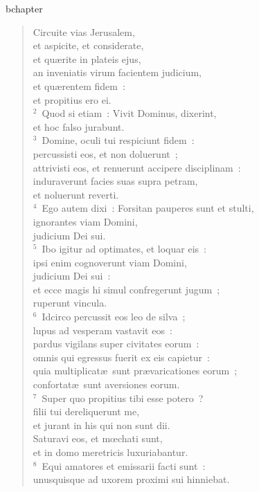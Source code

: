 bchapter\begin{verse}\vspace{-19pt}Circuite vias Jerusalem,\\ et aspicite, et considerate,\\ et qu\ae rite in plateis ejus,\\ an inveniatis virum facientem judicium,\\ et qu\ae rentem fidem~:\\ et propitius ero ei.\\
${}^{2}$~Quod si etiam~: Vivit Dominus, dixerint,\\ et hoc falso jurabunt.\\
${}^{3}$~Domine, oculi tui respiciunt fidem~:\\ percussisti eos, et non doluerunt~;\\ attrivisti eos, et renuerunt accipere disciplinam~:\\ induraverunt facies suas supra petram,\\ et noluerunt reverti.\\
${}^{4}$~Ego autem dixi~: Forsitan pauperes sunt et stulti,\\ ignorantes viam Domini,\\ judicium Dei sui.\\
${}^{5}$~Ibo igitur ad optimates, et loquar eis~:\\ ipsi enim cognoverunt viam Domini,\\ judicium Dei sui~:\\ et ecce magis hi simul confregerunt jugum~;\\ ruperunt vincula.\\
${}^{6}$~Idcirco percussit eos leo de silva~;\\ lupus ad vesperam vastavit eos~:\\ pardus vigilans super civitates eorum~:\\ omnis qui egressus fuerit ex eis capietur~:\\ quia multiplicat\ae\ sunt pr\ae varicationes eorum~;\\ confortat\ae\ sunt aversiones eorum.\\
${}^{7}$~Super quo propitius tibi esse potero~?\\ filii tui dereliquerunt me,\\ et jurant in his qui non sunt dii.\\ Saturavi eos, et mœchati sunt,\\ et in domo meretricis luxuriabantur.\\
${}^{8}$~Equi amatores et emissarii facti sunt~:\\ unusquisque ad uxorem proximi sui hinniebat.\\

\end{verse}
